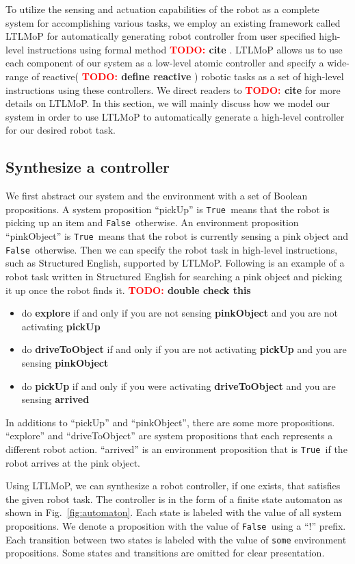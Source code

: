 \documentclass[conference]{IEEEtran}
\newcommand{\TODO}[1]{ {\bf \textcolor{red}{TODO:} #1 }}
\newcommand{\lt}{{\tt True }}
\newcommand{\lf}{{\tt False }}
\begin{document}
To utilize the sensing and actuation capabilities of the robot as a complete system for accomplishing various tasks, we employ an existing framework called LTLMoP for automatically generating robot controller from user specified high-level instructions using formal method \TODO{cite}.
LTLMoP allows us to use each component of our system as a low-level atomic controller and specify a wide-range of reactive(\TODO{define reactive}) robotic tasks as a set of high-level instructions using these controllers.
We direct readers to \TODO{cite} for more details on LTLMoP.
In this section, we will mainly discuss how we model our system in order to use LTLMoP to automatically generate a high-level controller for our desired robot task.

\subsection{Synthesize a controller}
We first abstract our system and the environment with a set of Boolean propositions.
A system proposition ``pickUp'' is \lt means that the robot is picking up an item and \lf otherwise.
An environment proposition ``pinkObject'' is \lt means that the robot is currently sensing a pink object and \lf otherwise.
Then we can specify the robot task in high-level instructions, such as Structured English, supported by LTLMoP.
Following is an example of a robot task written in Structured English for searching a pink object and picking it up once the robot finds it. \TODO{double check this}

\begin{itemize}
\item do {\bf explore} if and only if you are not sensing {\bf pinkObject} and you are not activating {\bf pickUp}
\item do {\bf driveToObject} if and only if you are not activating {\bf pickUp} and you are sensing {\bf pinkObject}
\item do {\bf pickUp} if and only if you were activating {\bf driveToObject} and you are sensing {\bf arrived}
\end{itemize}

In additions to ``pickUp'' and ``pinkObject'', there are some more propositions. 
``explore'' and ``driveToObject'' are system propositions that each represents a different robot action.
``arrived'' is an environment proposition that is \lt if the robot arrives at the pink object.

Using LTLMoP, we can synthesize a robot controller, if one exists, that satisfies the given robot task. The controller is in the form of a finite state automaton as shown in Fig.~\ref{fig:automaton}. Each state is labeled with the value of all system propositions. We denote a proposition with the value of \lf using a ``!'' prefix. Each transition between two states is labeled with the value of {\tt some} environment propositions. Some states and transitions are omitted for clear presentation.
\end{document}

